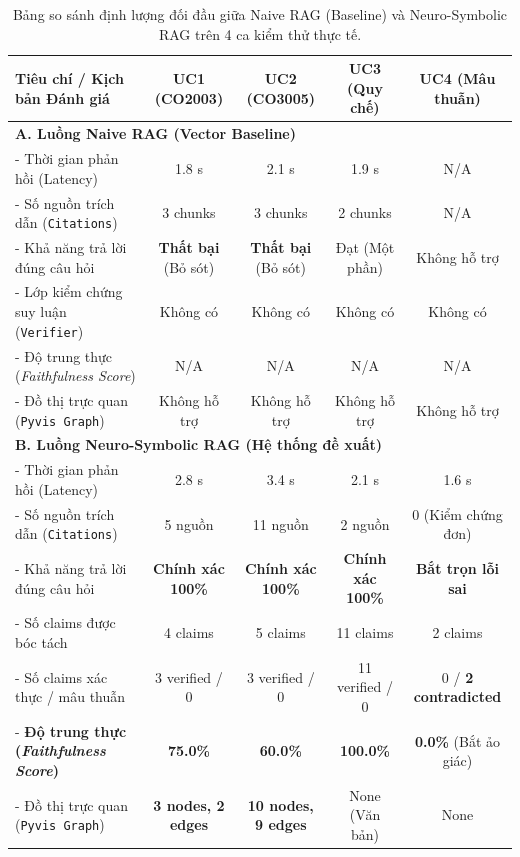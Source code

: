 \documentclass[a4paper,12pt]{article}
\begin{document}
\begin{table}[htbp]
\centering
\small
\begin{tabularx}{\textwidth}{l c c c c}
\toprule
\textbf{Tiêu chí / Kịch bản Đánh giá} & \textbf{UC1 (CO2003)} & \textbf{UC2 (CO3005)} & \textbf{UC3 (Quy chế)} & \textbf{UC4 (Mâu thuẫn)} \\
\midrule
\multicolumn{5}{l}{\textbf{A. Luồng Naive RAG (Vector Baseline)}} \\
- Thời gian phản hồi (Latency) & 1.8 s & 2.1 s & 1.9 s & N/A \\
- Số nguồn trích dẫn (\texttt{Citations}) & 3 chunks & 3 chunks & 2 chunks & N/A \\
- Khả năng trả lời đúng câu hỏi & \textbf{Thất bại} (Bỏ sót) & \textbf{Thất bại} (Bỏ sót) & Đạt (Một phần) & Không hỗ trợ \\
- Lớp kiểm chứng suy luận (\texttt{Verifier}) & Không có & Không có & Không có & Không có \\
- Độ trung thực (\textit{Faithfulness Score}) & N/A & N/A & N/A & N/A \\
- Đồ thị trực quan (\texttt{Pyvis Graph}) & Không hỗ trợ & Không hỗ trợ & Không hỗ trợ & Không hỗ trợ \\
\midrule
\multicolumn{5}{l}{\textbf{B. Luồng Neuro-Symbolic RAG (Hệ thống đề xuất)}} \\
- Thời gian phản hồi (Latency) & 2.8 s & 3.4 s & 2.1 s & 1.6 s \\
- Số nguồn trích dẫn (\texttt{Citations}) & 5 nguồn & 11 nguồn & 2 nguồn & 0 (Kiểm chứng đơn) \\
- Khả năng trả lời đúng câu hỏi & \textbf{Chính xác 100\%} & \textbf{Chính xác 100\%} & \textbf{Chính xác 100\%} & \textbf{Bắt trọn lỗi sai} \\
- Số claims được bóc tách & 4 claims & 5 claims & 11 claims & 2 claims \\
- Số claims xác thực / mâu thuẫn & 3 verified / 0 & 3 verified / 0 & 11 verified / 0 & 0 / \textbf{2 contradicted} \\
- \textbf{Độ trung thực (\textit{Faithfulness Score})} & \textbf{75.0\%} & \textbf{60.0\%} & \textbf{100.0\%} & \textbf{0.0\%} (Bắt ảo giác) \\
- Đồ thị trực quan (\texttt{Pyvis Graph}) & \textbf{3 nodes, 2 edges} & \textbf{10 nodes, 9 edges} & None (Văn bản) & None \\
\bottomrule
\end{tabularx}
\caption{Bảng so sánh định lượng đối đầu giữa Naive RAG (Baseline) và Neuro-Symbolic RAG trên 4 ca kiểm thử thực tế.}
\label{tab:experiments_head_to_head}
\end{table}
\end{document}
